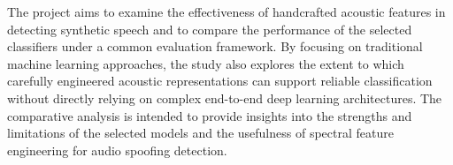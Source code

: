 \documentclass[12pt,a4paper]{report}
\begin{document}
\vspace{0.3cm}

\noindent
The project aims to examine the effectiveness of handcrafted acoustic features in detecting synthetic speech and to compare the performance of the selected classifiers under a common evaluation framework. By focusing on traditional machine learning approaches, the study also explores the extent to which carefully engineered acoustic representations can support reliable classification without directly relying on complex end-to-end deep learning architectures. The comparative analysis is intended to provide insights into the strengths and limitations of the selected models and the usefulness of spectral feature engineering for audio spoofing detection. 

\clearpage

\clearpage


\setlength{\cftaftertoctitleskip}{1em}
\setlength{\cftafterlottitleskip}{2em}
\setlength{\cftafterloftitleskip}{1em}

\setlength{\cftbeforechapskip}{.8em}
\setlength{\cftbeforesecskip}{2pt}
\setlength{\cftbeforesubsecskip}{1pt}

\renewcommand{\cftlottitlefont}
    {\hfill\fontsize{18pt}{20pt}\bfseries\selectfont}
\renewcommand{\cftafterlottitle}{\hfill}

\renewcommand{\cftloftitlefont}
    {\hfill\fontsize{18pt}{20pt}\bfseries\selectfont}
\renewcommand{\cftafterloftitle}{\hfill}

\renewcommand{\cfttoctitlefont}
    {\hfill\fontsize{18pt}{20pt}\bfseries\selectfont}
\renewcommand{\cftaftertoctitle}{\hfill}

\clearpage
{}

\vspace*{-2.5cm}
\listoftables
\thispagestyle{prelimpages}

\clearpage

\end{document}
